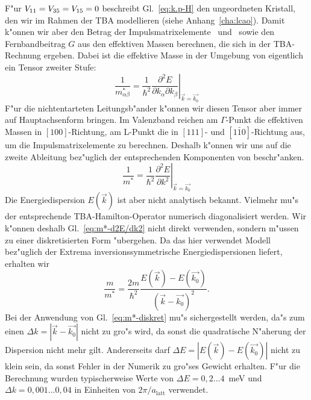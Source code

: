 F"ur $V_{11} = V_{35} = V_{15} = 0$ beschreibt Gl.~\eqref{eq:k.p-H}
den ungeordneten Kristall, den wir im Rahmen der TBA modellieren (siehe
Anhang~\ref{cha:lcao}). Damit k"onnen wir aber den Betrag der
Impulsmatrixelemente \PG\ und \PL\ sowie den Fernbandbeitrag $G$ aus den
effektiven Massen berechnen, die sich in der TBA-Rechnung ergeben. Dabei ist
die effektive Masse in der Umgebung von  eigentlich ein
Tensor zweiter Stufe: 
%
\begin{displaymath}
   \frac{1}{m^{\ast}_{\alpha\beta}} = \left. \frac{1}{\hbar^{2}}
   \frac{\partial^{2} E}{\partial k_{\alpha} \partial k_{\beta}}
   \right|_{\vec{k}=\vec{k_{\text{0}}}} 
\end{displaymath}
%
F"ur die nichtentarteten Leitungsb"ander k"onnen wir diesen Tensor aber immer
auf Hauptachsenform bringen. Im Valenzband reichen am $\Gamma$-Punkt die
effektiven Massen in $[100]$-Richtung, am L-Punkt die in $[111]$- und $[1
\bar{1} 0]$-Richtung aus, um die Impulsmatrixelemente zu berechnen. Deshalb
k"onnen wir uns auf die zweite Ableitung bez"uglich der entsprechenden
Komponenten von  beschr"anken.
%
\begin{equation}
  \label{eq:m*-d2E/dk2}
  \frac{1}{m^{\ast}} = \left. \frac{1}{\hbar^{2}} \frac{\partial^{2}
  E}{\partial k^{2}} \right|_{\vec{k}=\vec{k_{\text{0}}}}
\end{equation}
%
Die Energiedispersion $E(\vec{k})$ ist aber nicht analytisch bekannt. Vielmehr
mu"s der entsprechende TBA-Hamilton-Operator numerisch diagonalisiert 
werden. Wir k"onnen deshalb Gl.~\eqref{eq:m*-d2E/dk2} nicht direkt verwenden,
sondern m"ussen zu einer diskretisierten Form "ubergehen. Da das hier
verwendet Modell bez"uglich der Extrema 
inversionssymmetrische Energiedispersionen liefert, erhalten wir
%
\begin{equation}
  \label{eq:m*-diskret}
  \frac{m}{m^{\ast}} = \frac{2m}{\hbar^{2}}
  \frac{E(\vec{k}) - E(\vec{k_{\text{0}}})}
  {(\vec{k} - \vec{k_{\text{0}}})^{2}}.
\end{equation}
%
Bei der Anwendung von Gl.~\eqref{eq:m*-diskret} mu"s sichergestellt werden,
da"s zum einen $\Delta k = |\vec{k}-\vec{k_{\text{0}}}|$ nicht zu gro"s wird,
da sonst die quadratische N"aherung der Dispersion nicht mehr gilt.
Andererseits darf $\Delta E = |E(\vec{k}) - E(\vec{k_{\text{0}}})|$ nicht zu
klein sein, da sonst Fehler in der Numerik
zu gro"ses
Gewicht erhalten. F"ur die Berechnung wurden typischerweise Werte von $\Delta E
= 0,2 \dots 4$~meV und $\Delta k = 0,001 \dots 0,04$ in Einheiten von
$2\pi/a_{\text{latt}}$ verwendet.

